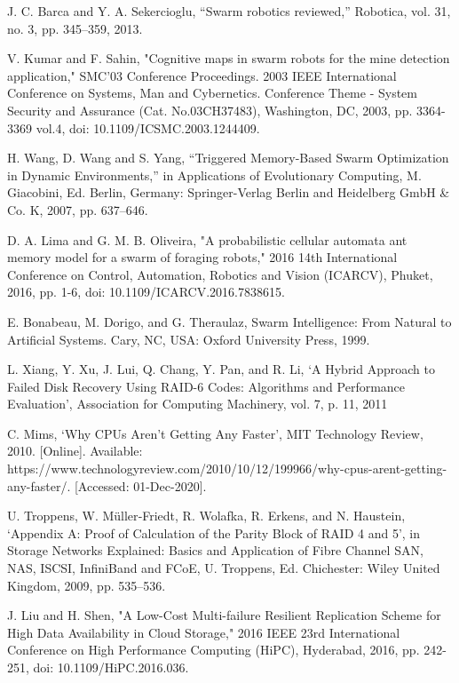 \documentclass{UoYCSproject}
\begin{document}
\begin{thebibliography}{100}
J. C. Barca and Y. A. Sekercioglu, “Swarm robotics reviewed,” Robotica, vol. 31, no. 3, pp. 345–359, 2013.

V. Kumar and F. Sahin, "Cognitive maps in swarm robots for the mine detection application," SMC'03 Conference Proceedings. 2003 IEEE International Conference on Systems, Man and Cybernetics. Conference Theme - System Security and Assurance (Cat. No.03CH37483), Washington, DC, 2003, pp. 3364-3369 vol.4, doi: 10.1109/ICSMC.2003.1244409.

H. Wang, D. Wang and S. Yang, “Triggered Memory-Based Swarm Optimization in Dynamic Environments,” in Applications of Evolutionary Computing, M. Giacobini, Ed. Berlin, Germany: Springer-Verlag Berlin and Heidelberg GmbH \& Co. K, 2007, pp. 637–646.

D. A. Lima and G. M. B. Oliveira, "A probabilistic cellular automata ant memory model for a swarm of foraging robots," 2016 14th International Conference on Control, Automation, Robotics and Vision (ICARCV), Phuket, 2016, pp. 1-6, doi: 10.1109/ICARCV.2016.7838615.

E. Bonabeau, M. Dorigo, and G. Theraulaz, Swarm Intelligence: From Natural to Artificial Systems. Cary, NC, USA: Oxford University Press, 1999.

L. Xiang, Y. Xu, J. Lui, Q. Chang, Y. Pan, and R. Li, ‘A Hybrid Approach to Failed Disk Recovery Using RAID-6 Codes: Algorithms and Performance Evaluation’, Association for Computing Machinery, vol. 7, p. 11, 2011

C. Mims, ‘Why CPUs Aren’t Getting Any Faster’, MIT Technology Review, 2010. [Online]. Available: https://www.technologyreview.com/2010/10/12/199966/why-cpus-arent-getting-any-faster/. [Accessed: 01-Dec-2020].

U. Troppens, W. Müller‐Friedt, R. Wolafka, R. Erkens, and N. Haustein, ‘Appendix A: Proof of Calculation of the Parity Block of RAID 4 and 5’, in Storage Networks Explained: Basics and Application of Fibre Channel SAN, NAS, ISCSI, InfiniBand and FCoE, U. Troppens, Ed. Chichester: Wiley United Kingdom, 2009, pp. 535–536.

J. Liu and H. Shen, "A Low-Cost Multi-failure Resilient Replication Scheme for High Data Availability in Cloud Storage," 2016 IEEE 23rd International Conference on High Performance Computing (HiPC), Hyderabad, 2016, pp. 242-251, doi: 10.1109/HiPC.2016.036.


\end{thebibliography}
\end{document}

